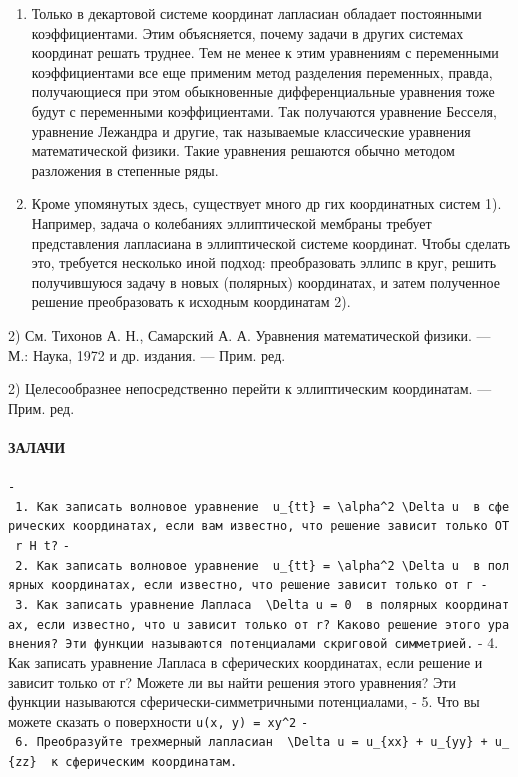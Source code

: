 \documentclass[
  ukrainian,
]{article}
\begin{document}
\begin{enumerate}
\def\labelenumi{\arabic{enumi}.}
\item
  Только в декартовой системе координат лапласиан обладает постоянными
  коэффициентами. Этим объясняется, почему задачи в других системах
  координат решать труднее. Тем не менее к этим уравнениям с переменными
  коэффициентами все еще применим метод разделения переменных, правда,
  получающиеся при этом обыкновенные дифференциальные уравнения тоже
  будут с переменными коэффициентами. Так получаются уравнение Бесселя,
  уравнение Лежандра и другие, так называемые классические уравнения
  математической физики. Такие уравнения решаются обычно методом
  разложения в степенные ряды.
\item
  Кроме упомянутых здесь, существует много др гих координатных систем
  1). Например, задача о колебаниях эллиптической мембраны требует
  представления лапласиана в эллиптической системе координат. Чтобы
  сделать это, требуется несколько иной подход: преобразовать эллипс в
  круг, решить получившуюся задачу в новых (полярных) координатах, и
  затем полученное решение преобразовать к исходным координатам 2).
\end{enumerate}

2) См. Тихонов А. Н., Самарский А. А. Уравнения математической физики.
--- М.: Наука, 1972 и др. издания. --- Прим. ред.

2) Целесообразнее непосредственно перейти к эллиптическим координатам.
--- Прим. ред.

\paragraph{ЗАЛАЧИ}\label{ux437ux430ux43bux430ux447ux438}

\texttt{-\ 1.\ Как\ записать\ волновое\ уравнение\ \ \textquotesingle{}u\_\{tt\}\ =\ \textbackslash{}alpha\^{}2\ \textbackslash{}Delta\ u\textquotesingle{}\ \ в\ сферических\ координатах,\ если\ вам\ известно,\ что\ решение\ зависит\ только\ OT\ r\ H\ t?}
\texttt{-\ 2.\ Как\ записать\ волновое\ уравнение\ \ \textquotesingle{}u\_\{tt\}\ =\ \textbackslash{}alpha\^{}2\ \textbackslash{}Delta\ u\textquotesingle{}\ \ в\ полярных\ координатах,\ если\ известно,\ что\ решение\ зависит\ только\ от\ г\ -\ 3.\ Как\ записать\ уравнение\ Лапласа\ \ \textquotesingle{}\textbackslash{}Delta\ u\ =\ 0\textquotesingle{}\ \ в\ полярных\ координатах,\ если\ известно,\ что\ u\ зависит\ только\ от\ r?\ Каково\ решение\ этого\ уравнения?\ Эти\ функции\ называются\ потенциалами\ с\textquotesingle{}криговой\ симметрией.}
- 4. Как записать уравнение Лапласа в сферических координатах, если
решение и зависит только от г? Можете ли вы найти решения этого
уравнения? Эти функции называются сферически-симметричными потенциалами,
- 5. Что вы можете сказать о поверхности \texttt{u(x,\ y)\ =\ xy\^{}2}
\texttt{-\ 6.\ Преобразуйте\ трехмерный\ лапласиан\ \ \textquotesingle{}\textbackslash{}Delta\ u\ =\ u\_\{xx\}\ +\ u\_\{yy\}\ +\ u\_\{zz\}\textquotesingle{}\ \ к\ сферическим\ координатам.}
\end{document}
